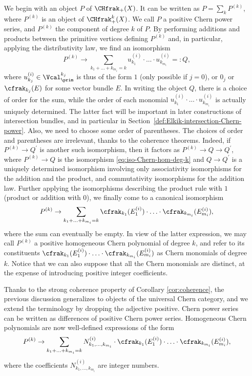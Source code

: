 We begin with an object $P$ of $\CHfrak_{+}(X)$. It can be written as $P=\sum_{k}P^{(k)}$, where $P^{(k)}$ is an object of $\CHfrak^{k}_{+}(X)$. We call $P$ a positive Chern power series, and $P^{(k)}$ the component of degree $k$ of $P$. By performing additions and products between the primitive vertices defining $P^{(k)}$ and, in particular, applying the distributivity law, we find an isomorphism
\begin{equation}\label{eq:iso-Chern-hom-deg-k}
P^{(k)}\to \sum_{k_{1}+\ldots+k_{m_{i}}=k}u_{k_{1}}^{(i)}\cdot\ldots\cdot u_{k_{m_{i}}}^{(i)}=:Q,
\end{equation}
where $u_{k_{j}}^{(i)}\in\Vcal^{k_{j}}_{\prim}$ is thus of the form $1$ (only possible if $j=0$), or $0_{j}$ or $\cfrak_{k_{j}}(E)$ for some vector bundle $E$. In writing the object $Q$, there is a choice of order for the sum, while the order of each monomial $u_{k_{1}}^{(i)}\cdot\ldots\cdot u_{k_{m_{i}}}^{(i)}$ is actually uniquely determined. The latter fact will be important in later constructions of intersection bundles, and in particular in Section~\ref{def:Elkik-intersection-Chern-power}. Also, we need to choose some order of parentheses. The choices of order and parentheses are irrelevant, thanks to the coherence theorems. Indeed, if $P^{(k)}\to Q^{\prime}$ is another such isomorphism, then it factors as $P^{(k)}\to Q\to Q^{\prime}$, where $P^{(k)}\to Q$ is the isomorphism \eqref{eq:iso-Chern-hom-deg-k} and $Q\to Q^{\prime}$ is a uniquely determined isomorphism involving only associativity isomorphisms for the addition and the product, and commutativity isomorphisms for the addition law. Further applying the isomorphisms describing the product rule with $1$ (\resp product or addition with $0$), we finally come to a canonical isomorphism
\begin{equation}\label{eq:iso-Chern-hom-deg-k-bis}
P^{(k)}\to \sum_{k_{1}+\ldots+k_{m_{i}}=k}\cfrak_{k_{1}}(E_{1}^{(i)})\cdot\ldots\cdot \cfrak_{k_{m_{i}}}(E_{m_{i}}^{(i)}),
\end{equation}
where the sum can eventually be empty. In view of the latter expression, we may call $P^{(k)}$ a positive homogeneous Chern polynomial of degree $k$, and refer to its constituents $\cfrak_{k_{1}}(E_{1}^{(i)})\cdot\ldots\cdot \cfrak_{k_{m_{i}}}(E_{m_{i}}^{(i)})$ as Chern monomials of degree $k$. Notice that we can also suppose that all the Chern monomials are distinct, at the expense of introducing positive integer coefficients.

Thanks to the strong coherence property of Corollary \ref{cor:coherence}, the previous discussion generalizes to objects of the universal Chern category, and we extend the terminology by dropping the adjective positive. Chern power series can be written as differences of positive Chern power series. Homogeneous Chern polynomials are now well-defined expressions of the form
\begin{displaymath}
P^{(k)}\to \sum_{k_{1}+\ldots+k_{m_{i}}=k}N_{k_{1},\ldots,k_{m_{i}}}^{(i)}\cdot\cfrak_{k_{1}}(E_{1}^{(i)})\cdot\ldots\cdot \cfrak_{k_{m_{i}}}(E_{m_{i}}^{(i)}),
\end{displaymath}
where the coefficients $N_{k_{1},\ldots,k_{m_{i}}}^{(i)}$ are integer numbers.

